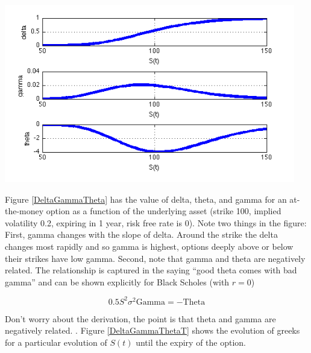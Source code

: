 \begin{center}
\includegraphics[width=5in]{pics/DeltaGammaTheta.png}
\label{DeltaGammaTheta}
\end{center}

Figure \ref{DeltaGammaTheta} has the value of delta, theta, and gamma for an at-the-money option as a function of the underlying asset (strike 100, implied volatility 0.2, expiring in 1 year, risk free rate is 0). Note two things in the figure: First, gamma changes with the slope of delta. Around the strike the delta changes most rapidly and so gamma  is highest, options deeply above or below their strikes have low gamma. Second, note that gamma and theta are negatively related. The relationship is captured in the saying ``good theta comes with bad gamma'' and can be shown explicitly for Black Scholes (with $r=0$)

\[ 0.5 S^2 \sigma^2 \mbox{Gamma} = -\mbox{Theta}\]

Don't worry about the derivation, the point is that theta and gamma are negatively related. . Figure \ref{DeltaGammaThetaT} shows the evolution of greeks for a particular evolution of $S(t)$ until the expiry of the option.


